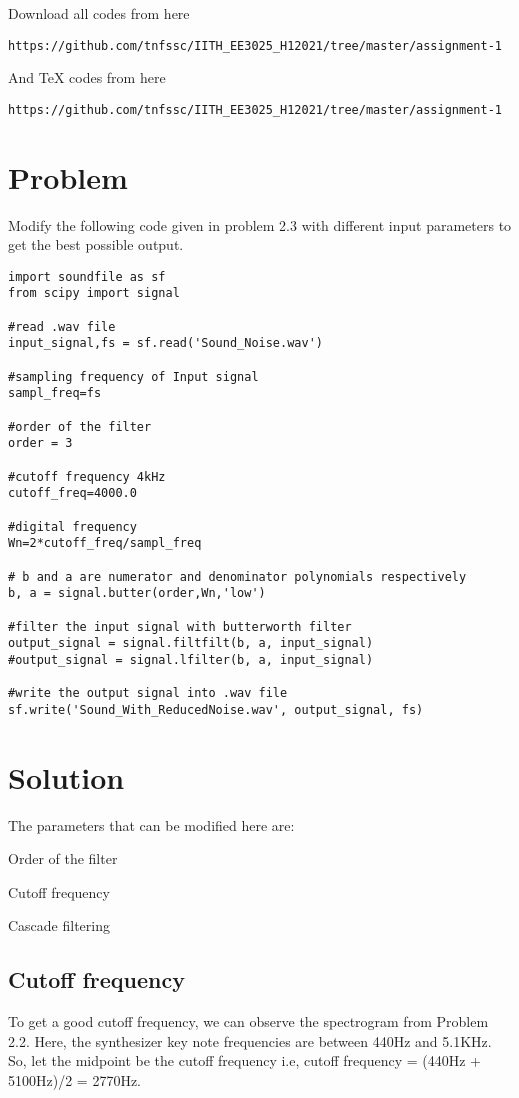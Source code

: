 \documentclass[journal,12pt]{IEEEtran}
\begin{document}
Download all codes from here
\begin{lstlisting}
https://github.com/tnfssc/IITH_EE3025_H12021/tree/master/assignment-1
\end{lstlisting}
And TeX codes from here
\begin{lstlisting}
https://github.com/tnfssc/IITH_EE3025_H12021/tree/master/assignment-1
\end{lstlisting}

\section{\textbf{Problem}}

Modify the following code given in problem 2.3 with different input parameters to get the best possible output.
\begin{lstlisting}
import soundfile as sf
from scipy import signal

#read .wav file
input_signal,fs = sf.read('Sound_Noise.wav')

#sampling frequency of Input signal
sampl_freq=fs

#order of the filter
order = 3

#cutoff frequency 4kHz
cutoff_freq=4000.0

#digital frequency
Wn=2*cutoff_freq/sampl_freq

# b and a are numerator and denominator polynomials respectively
b, a = signal.butter(order,Wn,'low')

#filter the input signal with butterworth filter
output_signal = signal.filtfilt(b, a, input_signal)
#output_signal = signal.lfilter(b, a, input_signal)

#write the output signal into .wav file
sf.write('Sound_With_ReducedNoise.wav', output_signal, fs)
\end{lstlisting}

\section{\textbf{Solution}}
The parameters that can be modified here are:
\begin{description}[font=$\bullet$\scshape\bfseries]
  \item[]{Order of the filter}
  \item[]{Cutoff frequency}
  \item[]{Cascade filtering}
\end{description}

\subsection{\textbf{Cutoff frequency}}
To get a good cutoff frequency, we can observe the spectrogram from Problem 2.2. Here, the synthesizer key note frequencies are between 440Hz and 5.1KHz. So, let the midpoint be the cutoff frequency i.e, cutoff frequency = (440Hz + 5100Hz)/2 = 2770Hz.
\end{document}
